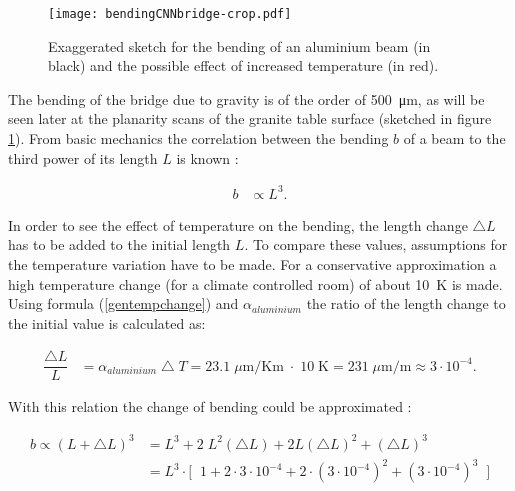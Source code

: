 \documentclass[
a4paper,                                %
twoside,                                %
BCOR1.4cm,                      %
10pt,                           %
headings=normal,                %
headsepline,                    %
clearplainpage, %
final,                                  %
div=14,
parskip=full,
openright,
bibliography=toc
]{scrreprt}
\begin{document}
\begin{figure}[H]
	\centering
	\texttt{[image: bendingCNNbridge-crop.pdf]}
	\caption{Exaggerated sketch for the bending of an aluminium beam (in black) and the possible effect of increased temperature (in red).}
	\label{bridgeBending}
\end{figure}

The bending of the bridge due to gravity is of the order of \SI{500}{\micro\m}, as will be seen later at the planarity scans of the granite table surface (sketched in figure \ref{bridgeBending}). From basic mechanics the correlation between the bending $b$ of a beam to the third power of its length $L$ is known \cite{ansysBook}:  

\begin{align}
	b &\propto L^{3}.
\end{align}

In order to see the effect of temperature on the bending, the length change $\bigtriangleup\!L$ has to be added to the initial length $L$. To compare these values, assumptions for the temperature variation have to be made. For a conservative approximation a high temperature change (for a climate controlled room) of about \SI{10}{\K} is made. Using formula (\ref{gentempchange}) and $\alpha_{aluminium}$ the ratio of the length change to the initial value is calculated as:

\begin{align}
	\dfrac{\bigtriangleup\!L}{L} &= \alpha_{aluminium} \bigtriangleup\!T = 23.1\;\mu \mathrm{m}/\mathrm{Km}\;\cdot\;10\;\mathrm{K} = 231\;\mu \mathrm{m}/\mathrm{m} \approx 3 \cdot 10^{-4}.
\end{align}

With this relation the change of bending could be approximated :

\begin{align}
	b \propto \left(L+\bigtriangleup\!L\right)^{3} &= L^{3} + 2\;L^{2} (\bigtriangleup\!L) + 2 L (\bigtriangleup\!L)^{2} + (\bigtriangleup\!L)^{3}
	\\
	 &= L^{3} \cdot \Big[ \;\; 1 + 2 \cdot 3 \cdot 10^{-4} + 2 \cdot \left(3 \cdot 10^{-4}\right)^{2} + \left(3 \cdot 10^{-4}\right)^{3} \;\; \Big]
	 \label{bendapprox}
\end{align}
\end{document}
